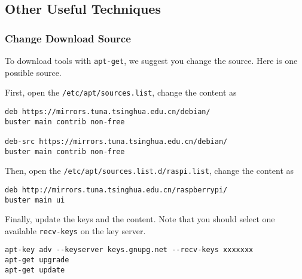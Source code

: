 \subsection{Other Useful Techniques}

\subsubsection{Change Download Source}

To download tools with \texttt{apt-get}, we suggest you change the source. Here is one possible source.

First, open the \texttt{/etc/apt/sources.list}, change the content as 

\begin{lstlisting}
deb https://mirrors.tuna.tsinghua.edu.cn/debian/ 
buster main contrib non-free

deb-src https://mirrors.tuna.tsinghua.edu.cn/debian/ 
buster main contrib non-free
\end{lstlisting}

Then, open the \texttt{/etc/apt/sources.list.d/raspi.list}, change the content as 

\begin{lstlisting}
deb http://mirrors.tuna.tsinghua.edu.cn/raspberrypi/ 
buster main ui
\end{lstlisting}

Finally, update the keys and the content. Note that you should select one available \texttt{recv-keys} on the key server.

\begin{lstlisting}
apt-key adv --keyserver keys.gnupg.net --recv-keys xxxxxxx
apt-get upgrade
apt-get update
\end{lstlisting}


